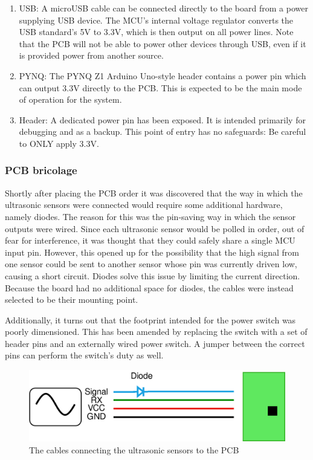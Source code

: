 \begin{enumerate}
    \item USB: A microUSB cable can be connected directly to the board from a power supplying USB device. The MCU's internal voltage regulator converts the USB standard's 5V to 3.3V, which is then output on all power lines. Note that the PCB will not be able to power other devices through USB, even if it is provided power from another source. 
    \item PYNQ: The PYNQ Z1 Arduino Uno-style header contains a power pin which can output 3.3V directly to the PCB. This is expected to be the main mode of operation for the system.
    \item Header: A dedicated power pin has been exposed. It is intended primarily for debugging and as a backup. This point of entry has no safeguards: Be careful to ONLY apply 3.3V. 
\end{enumerate}

\subsubsection{PCB bricolage}
Shortly after placing the PCB order it was discovered that the way in which the ultrasonic sensors were connected would require some additional hardware, namely diodes. The reason for this was the pin-saving way in which the sensor outputs were wired. Since each ultrasonic sensor would be polled in order, out of fear for interference, it was thought that they could safely share a single MCU input pin. However, this opened up for the possibility that the high signal from one sensor could be sent to another sensor whose pin was currently driven low, causing a short circuit. Diodes solve this issue by  limiting the current direction. Because the board had no additional space for diodes, the cables were instead selected to be their mounting point.

Additionally, it turns out that the footprint intended for the power switch was poorly dimensioned. This has been amended by replacing the switch with a set of header pins and an externally wired power switch. A jumper between the correct pins can perform the switch's duty as well. 

\begin{figure}[h!]
    \centering
    \includegraphics[scale=0.25]{Images/Cable.png}
    \caption{The cables connecting the ultrasonic sensors to the PCB}
    \label{fig:cable}
\end{figure}

\clearpage